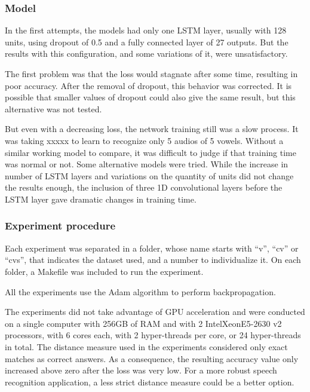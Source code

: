\subsubsection{Model}

In the first attempts, the models had only one LSTM layer, usually with 128 units, using dropout of 0.5 and a fully connected layer of 27 outputs. But the results with this configuration, and some variations of it, were unsatisfactory.

The first problem was that the loss would stagnate after some time, resulting in poor accuracy. After the removal of dropout, this behavior was corrected. It is possible that smaller values of dropout could also give the same result, but this alternative was not tested.

But even with a decreasing loss, the network training still was a slow process. It was taking xxxxx 
to learn to recognize only 5 audios of 5 vowels.
Without a similar working model to compare, it was difficult to judge if that training time was normal or not. Some alternative models were tried. While the increase in number of LSTM layers and variations on the quantity of units did not change the results enough, the inclusion of three 1D convolutional layers before the LSTM layer gave dramatic changes in training time.

\subsubsection{Experiment procedure}
Each experiment was separated in a folder, whose name starts with ``v'', ``cv'' or ``cvs'', that indicates the dataset used, and a number to individualize it. On each folder, a Makefile was included to run the experiment.

All the experiments use the Adam algorithm to perform backpropagation.

The experiments did not take advantage of GPU acceleration and were  conducted on a single computer with 256GB of RAM and with 2 Intel\textregistered Xeon\textregistered E5-2630 v2 processors, with 6 cores each, with 2 hyper-threads per core, or 24 hyper-threads in total. 
The distance measure used in the experiments considered only exact matches as correct answers. As a consequence, the resulting accuracy value only increased above zero after the loss was very low. For a more robust speech recognition application, a less strict distance measure could be a better option.

